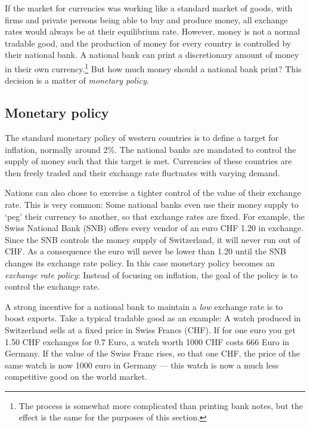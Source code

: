 If the market for currencies was working like a standard market of 
goods, with firms and private persons being able to buy and produce 
money, all exchange rates would always be at their equilibrium rate. 
However, money is not a normal tradable good, and the production of 
money for every country is controlled by their national bank. A national 
bank can print a discretionary amount of money in their own 
currency.\footnote{The process is somewhat more complicated than 
printing bank notes, but the effect is the same for the purposes of this 
section.} But how much money should a national bank print? This decision 
is a matter of \emph{monetary policy}. 

\subsection{Monetary policy}

The standard monetary policy of western countries is to define a target 
for inflation, normally around 2\%. The national banks are mandated to 
control the supply of money such that this target is met. Currencies of 
these countries are then freely traded and their exchange rate 
fluctuates with varying demand. 

Nations can also chose to exercise a tighter control of the value of 
their exchange rate. This is very common: Some national banks even use 
their money supply to `peg' their currency to another, so that exchange 
rates are fixed. For example, the Swiss National Bank (SNB) offers 
every vendor of an euro CHF 1.20 in exchange. Since the SNB controls 
the money supply of Switzerland, it will never run out of CHF. As a 
consequence the euro will never be lower than 1.20 until the SNB changes 
its exchange rate policy. In this case monetary policy becomes an 
\emph{exchange rate policy}: Instead of focusing on inflation, the goal 
of the policy is to control the exchange rate.

A strong incentive for a national bank to maintain a \emph{low} exchange 
rate is to boost exports. Take a typical tradable good as an example: A 
watch produced in Switzerland sells at a fixed price in Swiss Francs 
(CHF). If for one euro you get 1.50 CHF exchanges for 0.7 Euro, a watch 
worth 1000 CHF costs 666 Euro in Germany. If the value of the Swiss 
Franc rises, so that one CHF, the price of the same watch is now 1000 
euro in Germany --- this watch is now a much less competitive good on 
the world market.

